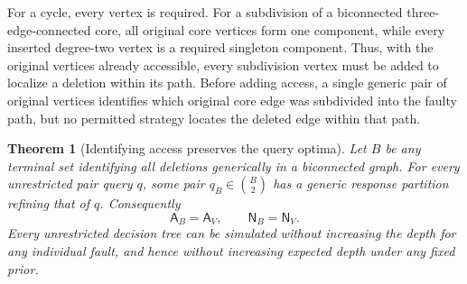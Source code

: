 \documentclass[11pt,letterpaper]{article}
\newtheorem{theorem}{Theorem}
\newcommand{\A}{\mathsf A}
\newcommand{\N}{\mathsf N}
\begin{document}
For a cycle, every vertex is required. For a subdivision of a biconnected three-edge-connected core, all original core vertices form one component, while every inserted degree-two vertex is a required singleton component. Thus, with the original vertices already accessible, every subdivision vertex must be added to localize a deletion within its path. Before adding access, a single generic pair of original vertices identifies which original core edge was subdivided into the faulty path, but no permitted strategy locates the deleted edge within that path.

\begin{theorem}[Identifying access preserves the query optima]\label{thm:accesspreserve}
Let $B$ be any terminal set identifying all deletions generically in a biconnected graph. For every unrestricted pair query $q$, some pair $q_B\in\binom B2$ has a generic response partition refining that of $q$. Consequently
\[
 \A_B=\A_V,\qquad \N_B=\N_V.
\]
Every unrestricted decision tree can be simulated without increasing the depth for any individual fault, and hence without increasing expected depth under any fixed prior.
\end{theorem}
\end{document}

